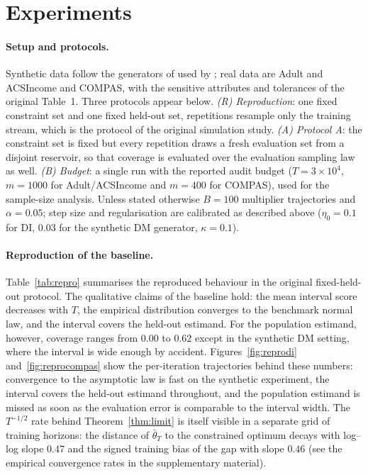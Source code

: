 \documentclass[10pt,twocolumn]{article}
\newcommand{\tbar}{\bar\theta}
\begin{document}
\section{Experiments}
\label{sec:exp}

\paragraph{Setup and protocols.} Synthetic data follow the generators of \citet{zafar2019} used by
\citet{roy2026uq}; real data are Adult and ACSIncome \citep{ding2021} and COMPAS, with the sensitive
attributes and tolerances of the original Table~1.  Three protocols appear below.
\emph{(R) Reproduction}: one fixed constraint set and one fixed held-out set, repetitions resample
only the training stream, which is the protocol of the original simulation study.
\emph{(A) Protocol A}: the constraint set is fixed but every repetition draws a fresh evaluation set
from a disjoint reservoir, so that coverage is evaluated over the evaluation sampling law as well.
\emph{(B) Budget}: a single run with the reported audit budget ($T=3\times10^4$, $m=1000$ for
Adult/ACSIncome and $m=400$ for COMPAS), used for the sample-size analysis.  Unless stated otherwise
$B=100$ multiplier trajectories and $\alpha=0.05$; step size and regularisation are calibrated as
described above ($\eta_0=0.1$ for DI, $0.03$ for the synthetic DM generator, $\kappa=0.1$).

\paragraph{Reproduction of the baseline.}
Table~\ref{tab:repro} summarises the reproduced behaviour in the original fixed-held-out protocol.
The qualitative claims of the baseline hold: the mean interval score decreases with $T$, the
empirical distribution converges to the benchmark normal law, and the interval covers the held-out
estimand.  For the population estimand, however, coverage ranges from $0.00$ to $0.62$ except in the
synthetic DM setting, where the interval is wide enough by accident.  Figures~\ref{fig:reprodi}
and~\ref{fig:reprocompas} show the per-iteration trajectories behind these numbers: convergence to
the asymptotic law is fast on the synthetic experiment, the interval covers the held-out estimand
throughout, and the population estimand is missed as soon as the evaluation error is comparable to
the interval width. The $T^{-1/2}$ rate behind Theorem~\ref{thm:limit} is itself visible in a separate grid of training horizons: the distance of $\tbar_T$ to the constrained optimum decays with log--log slope $0.47$ and the signed training bias of the gap with slope $0.46$ (see the empirical convergence rates in the supplementary material).
\end{document}
